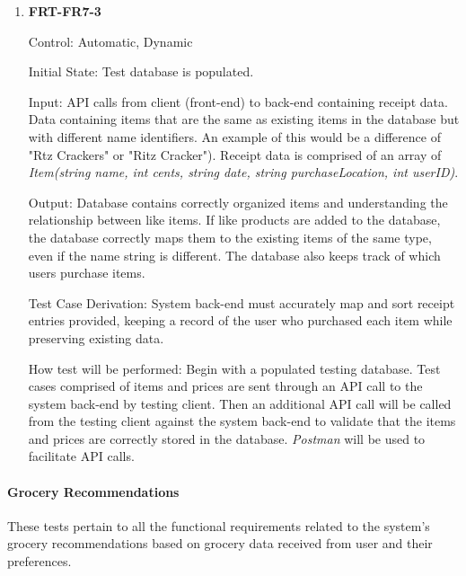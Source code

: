 \documentclass[12pt, titlepage]{article}
\begin{document}
\begin{enumerate}
\item{\textbf{FRT-FR7-3}}

Control: Automatic, Dynamic
          
Initial State: Test database is populated.

Input: API calls from client (front-end) to back-end containing receipt data. Data containing items that are the same as existing items in the database but with different name identifiers. An example of this would be a difference of "Rtz Crackers" or "Ritz Cracker"). Receipt data is comprised of an array of \textit{Item(string name, int cents, string date, string purchaseLocation, int userID)}.
          
Output: Database contains correctly organized items and understanding the relationship between like items. If like products are added to the database, the database correctly maps them to the existing items of the same type, even if the name string is different. The database also keeps track of which users purchase items.

Test Case Derivation: System back-end must accurately map and sort receipt entries provided, keeping a record of the user who purchased each item while preserving existing data.
          
How test will be performed: Begin with a populated testing database. Test cases comprised of items and prices are sent through an API call to the system back-end by testing client. Then an additional API call will be called from the testing client against the system back-end to validate that the items and prices are correctly stored in the database. \textit{Postman} will be used to facilitate API calls. 

\end{enumerate}

\paragraph{Grocery Recommendations}

These tests pertain to all the functional requirements related to the system's grocery recommendations based on grocery data received from user and their preferences.
\end{document}
